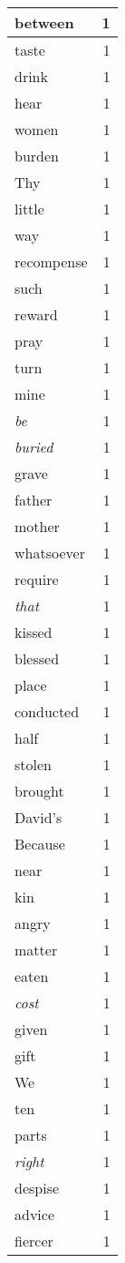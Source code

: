 \begin{center}
\begin{longtable}{l|r}
between & 1 \\ \hline
taste & 1 \\ \hline
drink & 1 \\ \hline
hear & 1 \\ \hline
women & 1 \\ \hline
burden & 1 \\ \hline
Thy & 1 \\ \hline
little & 1 \\ \hline
way & 1 \\ \hline
recompense & 1 \\ \hline
such & 1 \\ \hline
reward & 1 \\ \hline
pray & 1 \\ \hline
turn & 1 \\ \hline
mine & 1 \\ \hline
\emph{be} & 1 \\ \hline
\emph{buried} & 1 \\ \hline
grave & 1 \\ \hline
father & 1 \\ \hline
mother & 1 \\ \hline
whatsoever & 1 \\ \hline
require & 1 \\ \hline
\emph{that} & 1 \\ \hline
kissed & 1 \\ \hline
blessed & 1 \\ \hline
place & 1 \\ \hline
conducted & 1 \\ \hline
half & 1 \\ \hline
stolen & 1 \\ \hline
brought & 1 \\ \hline
David's & 1 \\ \hline
Because & 1 \\ \hline
near & 1 \\ \hline
kin & 1 \\ \hline
angry & 1 \\ \hline
matter & 1 \\ \hline
eaten & 1 \\ \hline
\emph{cost} & 1 \\ \hline
given & 1 \\ \hline
gift & 1 \\ \hline
We & 1 \\ \hline
ten & 1 \\ \hline
parts & 1 \\ \hline
\emph{right} & 1 \\ \hline
despise & 1 \\ \hline
advice & 1 \\ \hline
fiercer & 1 \\ \hline
\end{longtable}
\end{center}



